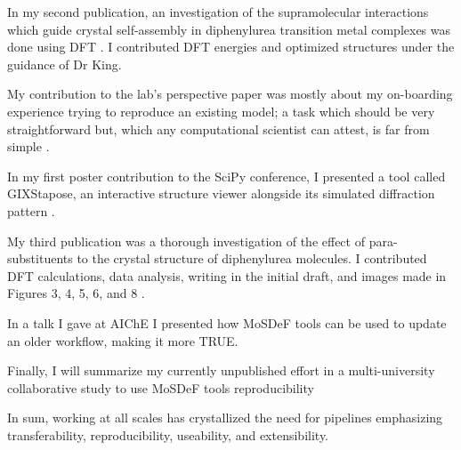 In my second publication, an investigation of the supramolecular interactions which guide crystal self-assembly in diphenylurea transition metal complexes was done using DFT \cite{Millard2019a}.
I contributed DFT energies and optimized structures under the guidance of Dr King.

My contribution to the lab's perspective paper was mostly about my on-boarding experience trying to reproduce an existing model; a task which should be very straightforward but, which any computational scientist can attest, is far from simple \cite{Jankowski2019}.

In my first poster contribution to the SciPy conference, I presented a tool called GIXStapose, an interactive structure viewer alongside its simulated diffraction pattern \cite{gixstapose, scipy2020}.

My third publication was a thorough investigation of the effect of para-substituents to the crystal structure of diphenylurea molecules. I contributed DFT calculations, data analysis, writing in the initial draft, and images made in Figures 3, 4, 5, 6, and 8 \cite{Fothergill2021}.

In a talk I gave at AIChE I presented how MoSDeF tools can be used to update an older workflow, making it more TRUE.

Finally, I will summarize my currently unpublished effort in a multi-university collaborative study to use MoSDeF tools reproducibility

In sum, working at all scales has crystallized the need for pipelines emphasizing transferability, reproducibility, useability, and extensibility.

